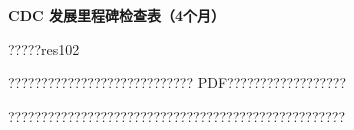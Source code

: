\documentclass[11pt]{article}
\begin{document}
{\color[HTML]{0A84FF}\LARGE\bfseries CDC 发展里程碑检查表（4个月）\par}
{\color[HTML]{667085}\small ?????res102\par}
\vspace{1em}
???????????????????????????? PDF??????????????????

???????????????????????????????????????????????????
\end{document}
